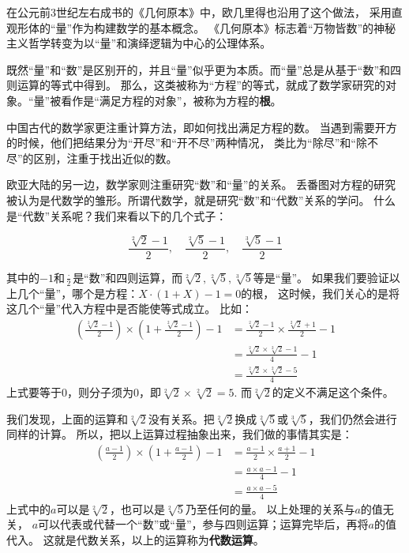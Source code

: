 \documentclass[12pt,UTF8,fontset=none]{ctexbook}
\begin{document}
\begin{appendix}
在公元前3世纪左右成书的《几何原本》中，欧几里得也沿用了这个做法，
采用直观形体的“量”作为构建数学的基本概念。
《几何原本》标志着“万物皆数”的神秘主义哲学转变为以“量”和演绎逻辑为中心的公理体系。

既然“量”和“数”是区别开的，并且“量”似乎更为本质。而“量”总是从基于“数”和四则运算的等式中得到。
那么，这类被称为“方程”的等式，就成了数学家研究的对象。“量”被看作是“满足方程的对象”，被称为方程的\textbf{根}。

中国古代的数学家更注重计算方法，即如何找出满足方程的数。
当遇到需要开方的时候，他们把结果分为“开尽”和“开不尽”两种情况，
类比为“除尽”和“除不尽”的区别，注重于找出近似的数。

欧亚大陆的另一边，数学家则注重研究“数”和“量”的关系。
丢番图对方程的研究被认为是代数学的雏形。所谓代数学，就是研究“数”和“代数”关系的学问。
什么是“代数”关系呢？我们来看以下的几个式子：

$$ \frac{\sqrt[2]{2} - 1}{2}, \quad \frac{\sqrt[2]{5} - 1}{2}, \quad \frac{\sqrt[3]{5} - 1}{2}$$

其中的$-1$和$\frac{\cdot}{2}$是“数”和四则运算，而$\sqrt[2]{2}, \sqrt[2]{5}, \sqrt[3]{5}$等是“量”。
如果我们要验证以上几个“量”，哪个是方程：$ X\cdot(1 + X) - 1 = 0 $的根，
这时候，我们关心的是将这几个“量”代入方程中是否能使等式成立。
比如：
\begin{align*}
    (\frac{\sqrt[2]{2} - 1}{2})\times(1 + \frac{\sqrt[2]{2} - 1}{2}) - 1 &= \frac{\sqrt[2]{2} - 1}{2} \times \frac{\sqrt[2]{2} + 1}{2} - 1  \\
    &= \frac{\sqrt[2]{2}\times \sqrt[2]{2} - 1}{4} - 1  \\
    &= \frac{\sqrt[2]{2}\times \sqrt[2]{2} - 5}{4}  
\end{align*}
上式要等于$0$，则分子须为$0$，即$\sqrt[2]{2}\times \sqrt[2]{2} = 5$. 而$\sqrt[2]{2}$的定义不满足这个条件。

我们发现，上面的运算和$\sqrt[2]{2}$没有关系。把$\sqrt[2]{2}$换成$\sqrt[2]{5}$或$\sqrt[3]{5}$，我们仍然会进行同样的计算。
所以，把以上运算过程抽象出来，我们做的事情其实是：
\begin{align*}
    (\frac{a - 1}{2})\times(1 + \frac{a - 1}{2}) - 1 &= \frac{a - 1}{2} \times \frac{a + 1}{2} - 1  \\
    &= \frac{a\times a - 1}{4} - 1  \\
    &= \frac{a\times a - 5}{4}  
\end{align*}
上式中的$a$可以是$\sqrt[2]{2}$，也可以是$\sqrt[2]{5}$乃至任何的量。
以上处理的关系与$a$的值无关，
$a$可以代表或代替一个“数”或“量”，参与四则运算；运算完毕后，再将$a$的值代入。
这就是代数关系，以上的运算称为\textbf{代数运算}。


\end{appendix}
\end{document}

